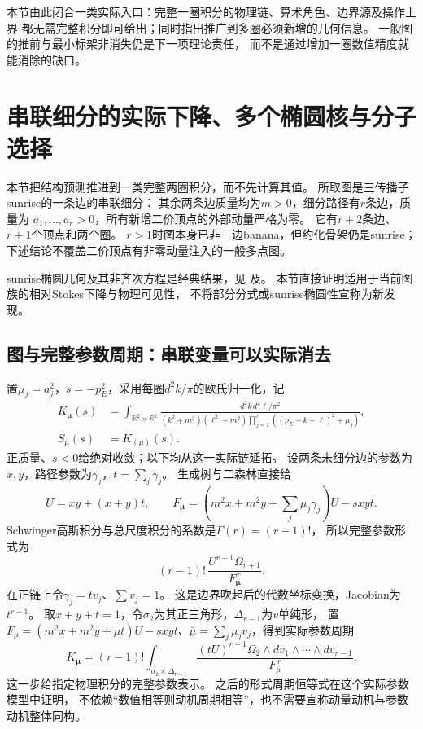 \documentclass[11pt,a4paper]{ctexart}
\theoremstyle{cnplain}\newtheorem{theorem}{定理}[section]
\theoremstyle{definition}\newtheorem{definition}[theorem]{定义}
\theoremstyle{remark}\newtheorem{remark}[theorem]{注}
\begin{document}
本节由此闭合一类实际入口：完整一圈积分的物理链、算术角色、边界源及操作上界
都无需完整积分即可给出；同时指出推广到多圈必须新增的几何信息。
一般图的推前与最小标架非消失仍是下一项理论责任，
而不是通过增加一圈数值精度就能消除的缺口。


\section{串联细分的实际下降、多个椭圆核与分子选择}
\label{sec:serieselliptic}
本节把结构预测推进到一类完整两圈积分，而不先计算其值。
所取图是三传播子sunrise的一条边的串联细分：
其余两条边质量均为$m>0$，细分路径有$r$条边，质量为
$a_1,\ldots,a_r>0$，所有新增二价顶点的外部动量严格为零。
它有$r+2$条边、$r+1$个顶点和两个圈。
$r>1$时图本身已非三边banana，但约化骨架仍是sunrise；
下述结论不覆盖二价顶点有非零动量注入的一般多点图。

sunrise椭圆几何及其非齐次方程是经典结果，见
\cite[\S4--5]{ABWsun}及\cite[\S3--4]{BKVsun}。
本节直接证明适用于当前图族的相对Stokes下降与物理可见性，
不将部分分式或sunrise椭圆性宣称为新发现。

\subsection{图与完整参数周期：串联变量可以实际消去}
置$\mu_j=a_j^2$，$s=-p_E^2$，采用每圈$d^2k/\pi$的欧氏归一化，记
\begin{align}
 K_{\boldsymbol\mu}(s)
 &=\int_{\mathbb R^2\times\mathbb R^2}
 \frac{d^2k\,d^2\ell/\pi^2}
 {(k^2+m^2)(\ell^2+m^2)
       \prod_{j=1}^r((p_E-k-\ell)^2+\mu_j)}, \label{eq:seriesmom}\\
 S_\mu(s)&=K_{(\mu)}(s).
\end{align}
正质量、$s<0$给绝对收敛；以下均从这一实际链延拓。
设两条未细分边的参数为$x,y$，路径参数为$\gamma_j$，$t=\sum_j\gamma_j$。
生成树与二森林直接给
\[
 U=xy+(x+y)t,\qquad
 F_{\boldsymbol\mu}
 =\left(m^2x+m^2y+\sum_j\mu_j\gamma_j\right)U-sxyt.
\]
Schwinger高斯积分与总尺度积分的系数是$\Gamma(r)=(r-1)!$，
所以完整参数形式为
\[
 (r-1)!\,\frac{U^{r-1}\Omega_{r+1}}{F_{\boldsymbol\mu}^{\,r}}.
\]
在正链上令$\gamma_j=t v_j$、$\sum v_j=1$。
这是边界吹起后的代数坐标变换，Jacobian为$t^{r-1}$。
取$x+y+t=1$，令$\sigma_2$为其正三角形，$\Delta_{r-1}$为$v$单纯形，
置$F_\mu=(m^2x+m^2y+\mu t)U-sxyt$、$\bar\mu=\sum_j\mu_jv_j$，得到实际参数周期
\begin{equation}\label{eq:seriessimplex}
 K_{\boldsymbol\mu}
 =(r-1)!\int_{\sigma_2\times\Delta_{r-1}}
 \frac{(tU)^{r-1}\Omega_2\wedge dv_1\wedge\cdots\wedge dv_{r-1}}
 {F_{\bar\mu}^{\,r}}.
\end{equation}
这一步给指定物理积分的完整参数表示。
之后的形式周期恒等式在这个实际参数模型中证明，
不依赖“数值相等则动机周期相等”，也不需要宣称动量动机与参数动机整体同构。
\end{document}
